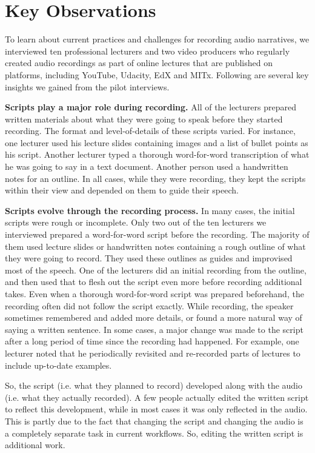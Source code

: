 \section{Key Observations}

To learn about current practices and challenges for recording audio narratives, we interviewed ten professional lecturers and two video producers who regularly created audio recordings as part of online lectures that are published on platforms, including YouTube, Udacity, EdX and MITx. Following are several key insights we gained from the pilot interviews.

\textbf{Scripts play a major role during recording.} All of the lecturers  prepared written materials about what they were going to speak before they started recording. The format and level-of-details of these scripts varied. For instance, one lecturer used his lecture slides containing images and a list of bullet points as his script. Another lecturer typed a thorough word-for-word transcription of what he was going to say  in a text document.
Another person used a handwritten notes for an outline. In all cases, while they were recording, they kept the scripts within their view and depended on them to guide their speech.  

\textbf{Scripts evolve through the recording process.}
In many cases, the initial scripts were rough or incomplete. Only two out of the ten lecturers we interviewed prepared a word-for-word script before the recording. The majority of them used lecture slides or handwritten notes containing a rough outline of what they were going to record. They used these outlines as guides and improvised most of the speech. One of the lecturers did an initial recording from the outline, and then used that to flesh out the script even more before recording additional takes. Even when a thorough word-for-word script was prepared beforehand,
the recording often did not follow
the script exactly. While recording, the speaker sometimes remembered and added more details, or
found a more natural way of saying a written sentence. In some cases, a major change was made to the script after a long period of time since the recording had happened. For example, one lecturer noted that
he
periodically revisited and re-recorded parts of lectures to
include up-to-date examples. 

So, the script (i.e. what they planned to record) developed along with the audio (i.e. what they actually recorded). A few people actually edited the written script to reflect this development, while in most cases it was only reflected in the audio. This is partly due to the fact that changing the script and changing the audio is a completely separate task in current workflows. So, editing the written script is additional work.

